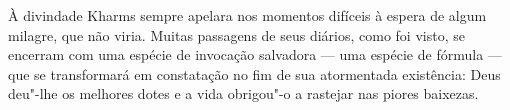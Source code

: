 À divindade Kharms sempre apelara nos momentos difíceis à espera de
algum milagre, que não viria. Muitas passagens de seus diários, como foi
visto, se encerram com uma espécie de invocação salvadora --- uma espécie
de fórmula --- que se transformará em constatação no fim de sua
atormentada existência: Deus deu"-lhe os melhores dotes e a vida
obrigou"-o a rastejar nas piores baixezas.













